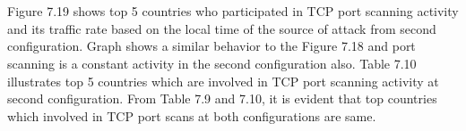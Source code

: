 \begin{table}[t!]
    \centering
    \caption{Top 5 countries participated in TCP port scanning activity at second configuration}
\end{table}
\\\\
Figure 7.19 shows top 5 countries who participated in TCP port scanning activity and its traffic rate based on the local time of the source of attack from second configuration.
Graph shows a similar behavior to the Figure 7.18 and port scanning is a constant activity in the second configuration also.
Table 7.10 illustrates top 5 countries which are involved in TCP port scanning activity at second configuration.
From Table 7.9 and 7.10, it is evident that top countries which involved in TCP port scans at both configurations are same.
